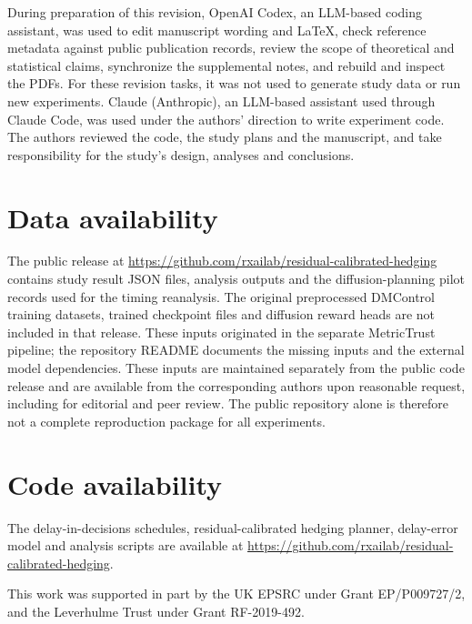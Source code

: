 \documentclass[aps,physrev,\manuscriptlayout,superscriptaddress,
  longbibliography,amsmath,amssymb]{revtex4-2}
\begin{document}
During preparation of this revision, OpenAI Codex, an LLM-based coding assistant, was used to edit manuscript wording and LaTeX, check reference metadata against public publication records, review the scope of theoretical and statistical claims, synchronize the supplemental notes, and rebuild and inspect the PDFs. For these revision tasks, it was not used to generate study data or run new experiments.
Claude (Anthropic), an LLM-based assistant used through Claude Code, was used under the authors' direction to write experiment code. The authors reviewed the code, the study plans and the manuscript, and take responsibility for the study's design, analyses and conclusions.



\section*{Data availability}

The public release\cite{xia2026rch} at \url{https://github.com/rxailab/residual-calibrated-hedging} contains study result JSON files, analysis outputs and the diffusion-planning pilot records used for the timing reanalysis. The original preprocessed DMControl training datasets, trained checkpoint files and diffusion reward heads are not included in that release. These inputs originated in the separate MetricTrust pipeline; the repository README documents the missing inputs and the external model dependencies. These inputs are maintained separately from the public code release and are available from the corresponding authors upon reasonable request, including for editorial and peer review. The public repository alone is therefore not a complete reproduction package for all experiments.

\section*{Code availability}

The delay-in-decisions schedules, residual-calibrated hedging planner, delay-error model and analysis scripts\cite{xia2026rch} are available at \url{https://github.com/rxailab/residual-calibrated-hedging}.


\begin{acknowledgments}

This work was supported in part by the UK EPSRC under Grant EP/P009727/2, and the Leverhulme Trust under Grant RF-2019-492.

\end{acknowledgments}
\end{document}
